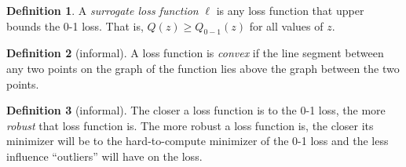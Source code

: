 \documentclass[10pt]{exam}
\theoremstyle{definition}
\newtheorem{defn}{Definition}
\begin{document}
\begin{defn}
    A \emph{surrogate loss function} $\ell$ is any loss function that upper bounds the 0-1 loss.
    That is,
        $Q(z) \ge Q_{0-1}(z)$
    for all values of $z$.
\end{defn}

\begin{defn}[informal]
    A loss function is \emph{convex} if the line segment between any two points on the graph of the function lies above the graph between the two points.
\end{defn}

\begin{defn}[informal]
    The closer a loss function is to the 0-1 loss, the more \emph{robust} that loss function is.
    The more robust a loss function is, the closer its minimizer will be to the hard-to-compute minimizer of the 0-1 loss and the less influence ``outliers'' will have on the loss.
\end{defn}
\end{document}
